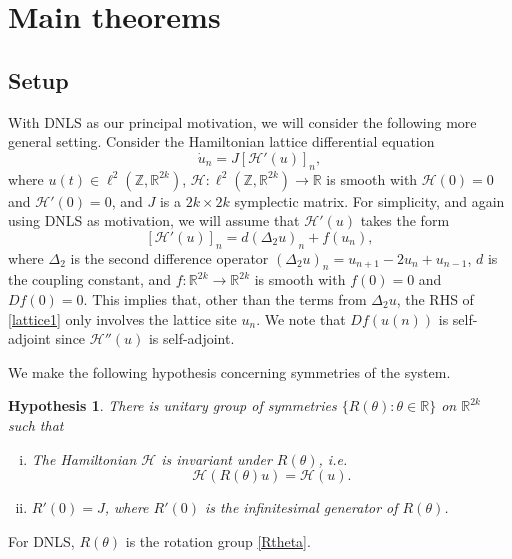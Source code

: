 \documentclass[12pt]{elsarticle}
\def\R{{\mathbb R}}
\def\Z{{\mathbb Z}}
\newtheorem{hypothesis}{Hypothesis}
\begin{document}
\section{Main theorems}

\subsection{Setup}

With DNLS as our principal motivation, we will consider the following more general setting. Consider the Hamiltonian lattice differential equation 
\begin{equation}\label{lattice1}
\dot{u}_n = J [\mathcal{H}'(u)]_n,
\end{equation}
where $u(t) \in \ell^2(\Z, \R^{2k})$, $\mathcal{H}: \ell^2(\Z, \R^{2k}) \rightarrow \R$ is smooth with $\mathcal{H}(0) = 0$ and $\mathcal{H}'(0) = 0$, and $J$ is a $2k \times 2k$ symplectic matrix. For simplicity, and again using DNLS as motivation, we will assume that $\mathcal{H}'(u)$ takes the form
\begin{equation}\label{latticeform}
[\mathcal{H}'(u)]_n = d (\Delta_2 u)_n + f(u_n),
\end{equation}
where $\Delta_2$ is the second difference operator $(\Delta_2 u)_n = u_{n+1} - 2 u_n + u_{n-1}$, $d$ is the coupling constant, and $f: \R^{2k} \rightarrow \R^{2k}$ is smooth with $f(0) = 0$ and $Df(0) = 0$. This implies that, other than the terms from $\Delta_2 u$, the RHS of \cref{lattice1} only involves the lattice site $u_n$. We note that $Df(u(n))$ is self-adjoint since $\mathcal{H}''(u)$ is self-adjoint.

We make the following hypothesis concerning symmetries of the system.
\begin{hypothesis}\label{symmetryhyp}
There is unitary group of symmetries $\{ R(\theta) : \theta \in \R \}$ on $\R^{2k}$ such that 
\begin{enumerate}[(i)]
\item The Hamiltonian $\mathcal{H}$ is invariant under $R(\theta)$, i.e. 
\begin{equation}\label{Hinvariance}
\mathcal{H}(R(\theta)u) = \mathcal{H}(u).
\end{equation}
\item $R'(0) = J$, where $R'(0)$ is the infinitesimal generator of $R(\theta)$.
\end{enumerate}
\end{hypothesis}
\noindent For DNLS, $R(\theta)$ is the rotation group \cref{Rtheta}.
\end{document}
